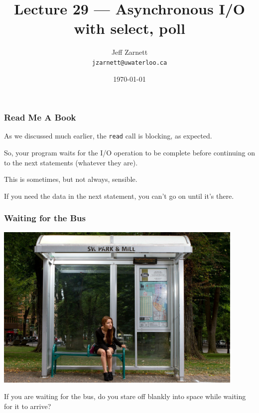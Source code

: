 

\title{Lecture 29 --- Asynchronous I/O with select, poll }

\author{Jeff Zarnett \\ \small \texttt{jzarnett@uwaterloo.ca}}
\date{\today}




\begin{frame}
  \titlepage

\end{frame}


\begin{frame}
\frametitle{Read Me A Book}

As we discussed much earlier, the \texttt{read} call is blocking, as expected. 

So, your program waits for the I/O operation to be complete before continuing on to the next statements (whatever they are). 

This is sometimes, but not always, sensible. 

If you need the data in the next statement, you can't go on until it's there.

\end{frame}


\begin{frame}
\frametitle{Waiting for the Bus}

\begin{center}
	\includegraphics[width=0.9\textwidth]{images/thebus.jpg}
\end{center}

If you are waiting for the bus, do you stare off blankly into space while waiting for it to arrive? 

\end{frame}

